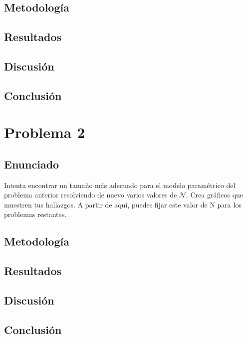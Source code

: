 \documentclass{article}
\begin{document}
\subsection{Metodología}

\subsection{Resultados}
\setcounter{equation}{0}

\subsection{Discusión}

\subsection{Conclusión}

\section{Problema 2}

\subsection{Enunciado}

Intenta encontrar un tamaño más adecuado para el modelo paramétrico del problema anterior resolviendo de nuevo varios valores de $\mathcal{N}$. Crea gráficos que muestren tus hallazgos. A partir de aquí, puedes fijar este valor de N para los problemas restantes.

\subsection{Metodología}

\subsection{Resultados}
\setcounter{equation}{0}

\subsection{Discusión}

\subsection{Conclusión}
\end{document}
